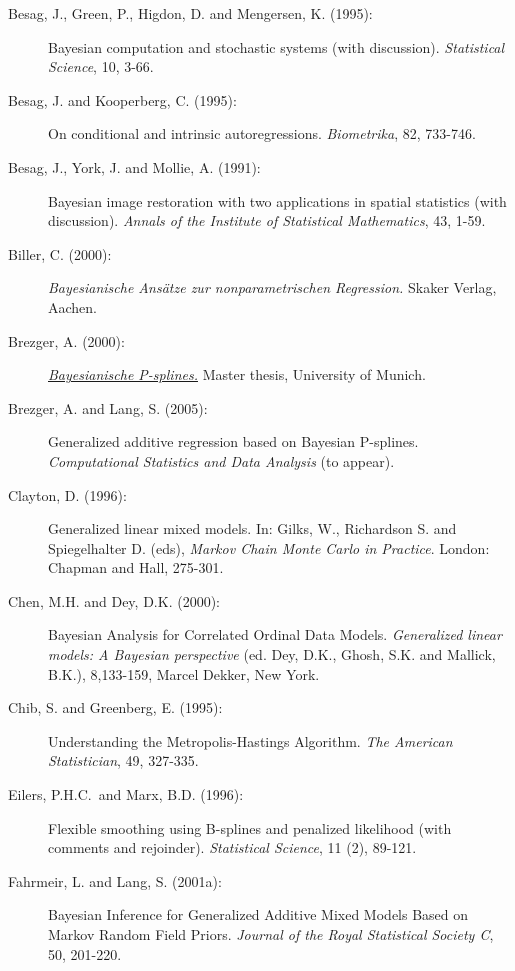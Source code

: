 \begin{description}

\item[Besag, J., Green, P., Higdon, D. and Mengersen, K. (1995):]
 Bayesian computation and stochastic systems (with discussion).
{\em Statistical Science}, 10, 3-66.

\item[Besag, J. and Kooperberg, C. (1995):] On conditional and intrinsic autoregressions.
{\em Biometrika}, 82, 733-746.

\item[Besag, J., York, J. and Mollie, A. (1991):]
Bayesian image restoration with two applications in spatial
statistics (with discussion). {\em Annals of the Institute of
Statistical Mathematics}, 43, 1-59.

\item[Biller, C. (2000):] {\em Bayesianische Ans\"atze zur nonparametrischen Regression.}
Skaker Verlag, Aachen.

\item[Brezger, A. (2000):] \href{http://www.stat.uni-muenchen.de/~andib}
{\em Bayesianische P-splines.} Master thesis, University of Munich.

\item[Brezger, A. and Lang, S. (2005):]
Generalized additive regression based on Bayesian P-splines. {\em
Computational Statistics and Data Analysis} (to appear).

\item[Clayton, D. (1996):] Generalized linear mixed models. In: Gilks, W., Richardson S. and
Spiegelhalter D. (eds), {\em Markov Chain Monte Carlo in
Practice}. London: Chapman and Hall, 275-301.

\item[Chen, M.H. and Dey, D.K. (2000):] Bayesian Analysis for Correlated Ordinal Data Models.
{\em Generalized linear models: A Bayesian perspective} (ed. Dey,
D.K., Ghosh, S.K. and Mallick, B.K.), 8,133-159, Marcel Dekker,
New York.

\item[Chib, S. and Greenberg, E. (1995):] Understanding the
Metropolis-Hastings Algorithm. {\em The American Statistician},
49, 327-335.

\item [Eilers, P.H.C.~and Marx, B.D. (1996):]
Flexible smoothing using B-splines and penalized likelihood (with
comments and rejoinder). {\it Statistical Science}, 11 (2),
89-121.

\item[Fahrmeir, L. and Lang, S. (2001a):]
Bayesian Inference for Generalized Additive Mixed Models Based on
Markov Random Field Priors. {\em Journal of the Royal Statistical
Society C}, 50, 201-220.


\end{description}
